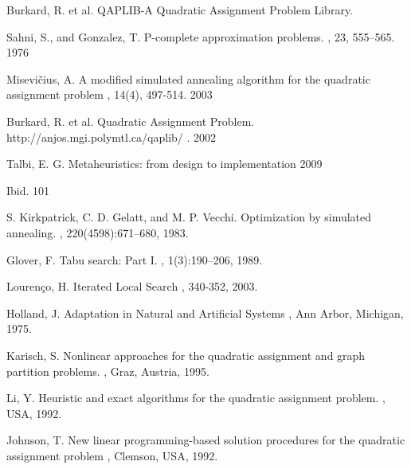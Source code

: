 \documentclass{ci5652}
\begin{document}
\begin{thebibliography}{99}

Burkard, R. et al.
\newblock QAPLIB-A Quadratic Assignment Problem Library.

Sahni, S., and Gonzalez, T.
\newblock P-complete approximation problems.
, 23, 555–565. 1976

Misevičius, A.
\newblock A modified simulated annealing algorithm for the quadratic assignment problem
, 14(4), 497-514. 2003

Burkard, R. et al.
\newblock Quadratic Assignment Problem.
\newblock http://anjos.mgi.polymtl.ca/qaplib/ . 2002

Talbi, E. G. 
\newblock Metaheuristics: from design to implementation
 2009

Ibid. 101

S. Kirkpatrick, C. D. Gelatt, and M. P. Vecchi. 
\newblock Optimization by simulated annealing.
, 220(4598):671–680, 1983.

Glover, F. 
\newblock Tabu search: Part I. 
, 1(3):190–206, 1989.

Lourenço, H.
\newblock Iterated Local Search
, 340-352, 2003.

Holland, J.
\newblock Adaptation in Natural and Artificial Systems 
, Ann Arbor, Michigan, 1975.

Karisch, S. 
\newblock Nonlinear approaches for the quadratic assignment and graph partition problems.
, Graz, Austria, 1995.

Li, Y.
\newblock Heuristic and exact algorithms for the quadratic assignment problem.
, USA, 1992.

Johnson, T.
\newblock New linear programming-based solution procedures for the quadratic assignment problem
, Clemson, USA, 1992.


\end{thebibliography}
\end{document}
